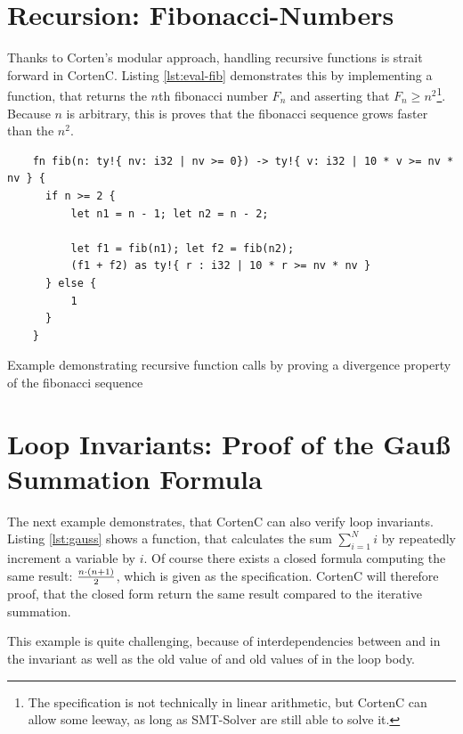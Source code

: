 \documentclass[twoside, english]{sdqthesis}
\theoremstyle{definition}
\begin{document}
\section{Recursion: Fibonacci-Numbers}

Thanks to Corten's modular approach, handling recursive functions is strait forward in CortenC. Listing \ref{lst:eval-fib} demonstrates this by implementing a function, that returns the $n$th fibonacci number $F_n$ and asserting that $F_n \geq n^2$\footnote{The specification is not technically in linear arithmetic, but CortenC can allow some leeway, as long as SMT-Solver are still able to solve it.}. Because $n$ is arbitrary, this is proves that the fibonacci sequence grows faster than the $n^2$.


\begin{listing}[ht]
  \begin{verbatim}
    fn fib(n: ty!{ nv: i32 | nv >= 0}) -> ty!{ v: i32 | 10 * v >= nv * nv } {
      if n >= 2 {
          let n1 = n - 1; let n2 = n - 2;

          let f1 = fib(n1); let f2 = fib(n2);
          (f1 + f2) as ty!{ r : i32 | 10 * r >= nv * nv }
      } else {
          1
      }
    }
  \end{verbatim}
  \caption{Example demonstrating recursive function calls by proving a divergence property of the fibonacci sequence}
  \label{lst:eval-fib}
\end{listing}


\label{sec:evaluation-gauss} \section{Loop Invariants: Proof of the Gauß Summation Formula}

The next example demonstrates, that CortenC can also verify loop invariants. Listing \ref{lst:gauss} shows a function, that calculates the sum $\sum_{i = 1}^N i$ by repeatedly increment a variable by $i$. 
Of course there exists a closed formula computing the same result: $n \cdot (n + 1) \over 2$, which is given as the specification. CortenC will therefore proof, that the closed form return the same result compared to the iterative summation.

This example is quite challenging, because of interdependencies between  and  in the invariant as well as the old value of  and old values of  in the loop body. 
\end{document}
